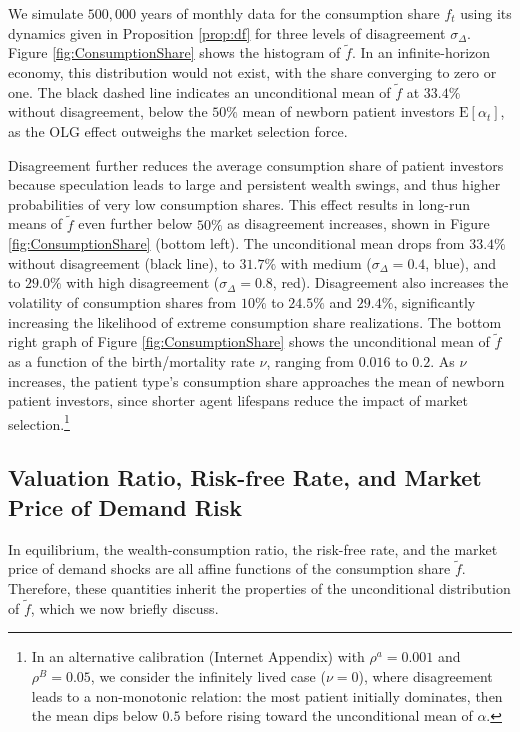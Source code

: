 \documentclass[preprint,11pt,authoryear]{elsarticle}
\theoremstyle{plain}
\begin{document}
We simulate $500,000$ years of monthly data for the consumption share $f_t$ using its dynamics given in Proposition \ref{prop:df} for three levels of disagreement $\sigma_{\Delta}$. Figure \ref{fig:ConsumptionShare} shows the histogram of $\tilde{f}$. In an infinite-horizon economy, this distribution would not exist, with the share converging to zero or one. The black dashed line indicates an unconditional mean of $\tilde{f}$ at $33.4\%$ without disagreement, below the $50\%$ mean of newborn patient investors $\mathrm{E}[ \alpha_t]$, as the OLG effect outweighs the market selection force.  
 

 

Disagreement further reduces the average consumption share of patient investors because speculation leads to large and persistent wealth swings, and thus higher probabilities of very low consumption shares. This effect results in long-run means of $\tilde{f}$ even further below $50\%$ as disagreement increases, shown in Figure \ref{fig:ConsumptionShare} (bottom left). The unconditional mean drops from $33.4\%$ without disagreement (black line), to $31.7\%$  with medium ($\sigma_{\Delta}= 0.4$, blue), and to $29.0\%$  with high disagreement ($\sigma_{\Delta}= 0.8$, red). Disagreement also increases the volatility of consumption shares from $10\%$ to $24.5\%$ and $29.4\%$, significantly increasing the likelihood of extreme consumption share realizations. The bottom right graph of Figure \ref{fig:ConsumptionShare} shows the unconditional mean of $\tilde{f}$ as a function of the birth/mortality rate $\nu$, ranging from $0.016$ to $0.2$. As $\nu$ increases, the patient type's consumption share approaches the mean of newborn patient investors, since shorter agent lifespans reduce the impact of market selection.\footnote{In an alternative calibration (Internet Appendix) with $\rho^a = 0.001$ and $\rho^B = 0.05$, we consider the infinitely lived case ($\nu = 0$), where disagreement leads to a non-monotonic relation: the most patient initially dominates, then the mean dips below $0.5$ before rising toward the unconditional mean of $\alpha$.}


\subsection{Valuation Ratio, Risk-free Rate, and Market Price of Demand Risk}

In equilibrium, the wealth-consumption ratio, the risk-free rate, and the market price of demand shocks are all affine functions of the consumption share \( \tilde{f} \). Therefore, these quantities inherit the properties of the unconditional distribution of \( \tilde{f} \), which we now briefly discuss.
\end{document}
